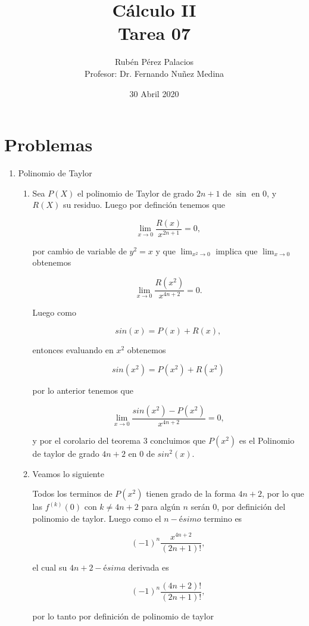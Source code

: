 \documentclass[letterpaper]{article}
\title{Cálculo II\\Tarea 07}
\author{Rubén Pérez Palacios\\Profesor: Dr. Fernando Nuñez Medina}
\date{30 Abril 2020}
\theoremstyle{definition}
\theoremstyle{lemathm}
\theoremstyle{lemademthm}
\begin{document}
	\maketitle
    
    \section*{Problemas}

    \begin{enumerate}
        
        \item Polinomio de Taylor
        
        \begin{enumerate}
            \item Sea $P(X)$ el polinomio de Taylor de grado $2n+1$ de $\sin$ en 0, y $R(X)$ su residuo. Luego por definción tenemos que
			
			\[\lim_{x \to 0} \frac{R(x)}{x^{2n+1}} = 0,\]

			por cambio de variable de $y^2 = x$ y que $\lim_{x^2\to0}$ implica que $\lim_{x\to0}$ obtenemos

			\[\lim_{x \to 0} \frac{R(x^2)}{x^{4n+2}} = 0.\]

			Luego como 

			\[sin(x) = P(x) + R(x),\]

			entonces evaluando en $x^2$ obtenemos

			\[sin(x^2) = P(x^2) + R(x^2)\]

			por lo anterior tenemos que

			\[\lim_{x\to0} \frac{sin(x^2) - P(x^2)}{x^{4n+2}} = 0,\]

			y por el corolario del teorema 3 concluimos que $P(x^2)$ es el Polinomio de taylor de grado $4n+2$ en $0$ de $sin^2(x)$.

            \item Veamos lo siguiente
			
			Todos los terminos de $P(x^2)$ tienen grado de la forma $4n+2$, por lo que las $f^{(k)}(0)$ con $k \neq 4n+2$ para algún $n$ serán $0$, por definición del polinomio de taylor. Luego como el $n-ésimo$ termino es 

			\[(-1)^n\frac{x^{4n+2}}{(2n+1)!},\]

			el cual su $4n+2-ésima$ derivada es

			\[(-1)^n\frac{(4n+2)!}{(2n+1)!},\]

			por lo tanto por definición de polinomio de taylor


\end{enumerate}
\end{enumerate}
\end{document}

